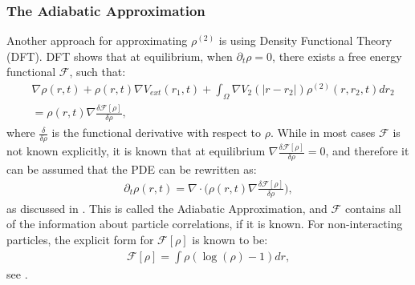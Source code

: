 \subsubsection*{The Adiabatic Approximation}
Another approach for approximating $\rho^{(2)}$ is using Density Functional Theory (DFT). DFT shows that at equilibrium, when $\partial_t \rho=0$, there exists a free energy functional $\mathcal{F}$, such that:
\begin{align*}
&\nabla \rho(r,t)
+ \rho(r,t)\nabla V_{ext}(r_1,t) 
+ \int_\Omega \nabla  V_2(|r - r_2|) \rho^{(2)}(r,r_2,t) dr_2 \\
 &= \rho(r,t) \nabla \frac{\delta \mathcal{F[\rho]}}{\delta \rho},
\end{align*}
where $\frac{\delta}{\delta \rho}$ is the functional derivative with respect to $\rho$.
While in most cases $\mathcal{F}$ is not known explicitly, it is known that at equilibrium $\nabla \frac{\delta \mathcal{F[\rho]}}{\delta \rho}=0$, and therefore it can be assumed that the PDE can be rewritten as:
\begin{align}\label{eqnAdiaAprox1}
\partial_t \rho(r,t) = \nabla \cdot \bigg( \rho(r,t) \nabla \frac{\delta \mathcal{F[\rho]}}{\delta \rho} \bigg), 
\end{align}
as discussed in \cite{GoddardPseudospectralCode1}.
This is called the Adiabatic Approximation, and $\mathcal{F}$ contains all of the information about particle correlations, if it is known.
For non-interacting particles, the explicit form for $\mathcal{F}[\rho]$ is known to be:
\begin{align}\label{eqnFhardrod}
\mathcal{F}[\rho] = \int \rho(\log(\rho)-1) dr,
\end{align}
see \cite{Tarazona2008}.

